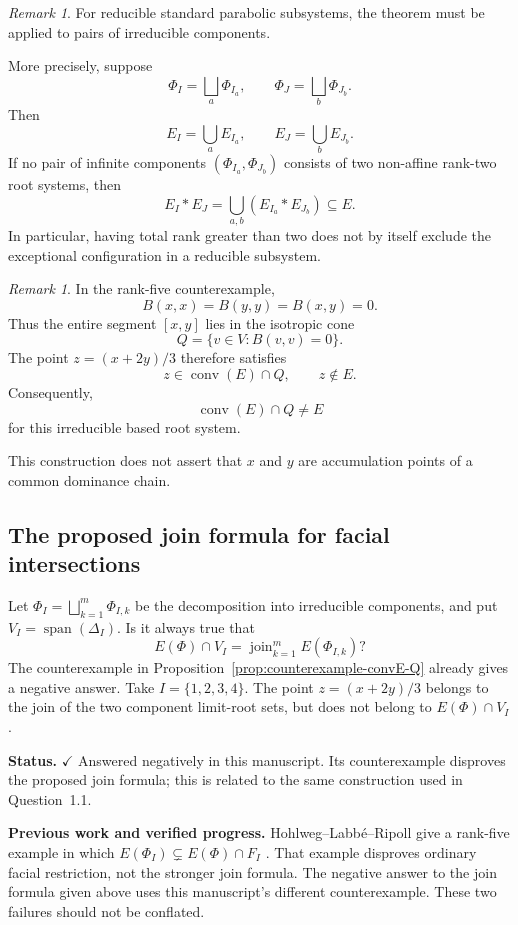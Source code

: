 \documentclass[11pt,reqno]{amsart}
\theoremstyle{plain}
\theoremstyle{definition}
\theoremstyle{remark}
\newtheorem{remark}[theorem]{Remark}
\numberwithin{equation}{section}
\begin{document}
\begin{remark}\label{rem:reducible-parabolic-join}
For reducible standard parabolic subsystems, the theorem must be
applied to pairs of irreducible components.

More precisely, suppose
\[
\Phi_I=\bigsqcup_a\Phi_{I_a},
\qquad
\Phi_J=\bigsqcup_b\Phi_{J_b}.
\]
Then
\[
E_I=\bigcup_a E_{I_a},
\qquad
E_J=\bigcup_b E_{J_b}.
\]
If no pair of infinite components
$(\Phi_{I_a},\Phi_{J_b})$ consists of two non-affine rank-two
root systems, then
\[
E_I*E_J
=
\bigcup_{a,b}(E_{I_a}*E_{J_b})
\subseteq E.
\]
In particular, having total rank greater than two does not by
itself exclude the exceptional configuration in a reducible
subsystem.
\end{remark}

\begin{remark}\label{rem:convex-hull-isotropic-counterexample}
In the rank-five counterexample,
\[
B(x,x)=B(y,y)=B(x,y)=0.
\]
Thus the entire segment $[x,y]$ lies in the isotropic cone
\[
Q=\{v\in V:B(v,v)=0\}.
\]
The point $z=(x+2y)/3$ therefore satisfies
\[
z\in\operatorname{conv}(E)\cap Q,
\qquad z\notin E.
\]
Consequently,
\[
\operatorname{conv}(E)\cap Q\ne E
\]
for this irreducible based root system.

This construction does not assert that $x$ and $y$ are
accumulation points of a common dominance chain.
\end{remark}

\subsection{The proposed join formula for facial intersections}

Let $\Phi_I=\bigsqcup_{k=1}^{m}\Phi_{I,k}$ be the decomposition
into irreducible components, and put $V_I=\operatorname{span}(\Delta_I)$.
Is it always true that
\[
E(\Phi)\cap V_I=\operatorname{join}_{k=1}^{m}E(\Phi_{I,k})?
\]
The counterexample in Proposition~\ref{prop:counterexample-convE-Q}
already gives a negative answer. Take $I=\{1,2,3,4\}$.
The point $z=(x+2y)/3$ belongs to the join of the two component
limit-root sets, but does not belong to $E(\Phi)\cap V_I$.


\par\medskip
\noindent\textbf{Status.} \(\checkmark\) Answered negatively in this manuscript. Its counterexample disproves the proposed join formula; this is related to the same construction used in Question~1.1.

\par\medskip
\noindent\textbf{Previous work and verified progress.}
Hohlweg--Labb\'e--Ripoll give a rank-five example in which
$E(\Phi_I)\subsetneq E(\Phi)\cap F_I$
\cite[Example~5.8]{HLR}. That example disproves ordinary facial
restriction, not the stronger join formula. The negative answer to the
join formula given above uses this manuscript's different counterexample.
These two failures should not be conflated.
\end{document}

